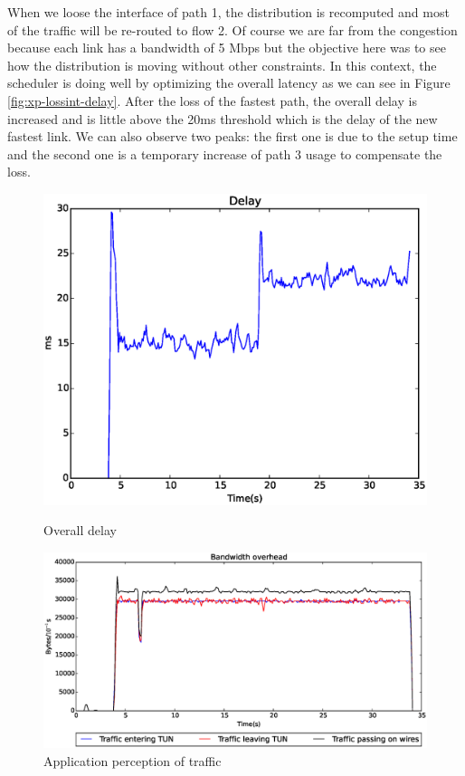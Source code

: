 When we loose the interface of path 1, the distribution is recomputed and most of the traffic will be re-routed to flow 2. Of course we are far from the congestion because each link has a bandwidth of 5 Mbps but the objective here was to see how the distribution is moving without other constraints. In this context, the scheduler is doing well by optimizing the overall latency as we can see in Figure \ref{fig:xp-lossint-delay}. After the loss of the fastest path, the overall delay is increased and is little above the  20ms threshold which is the delay of the new fastest link. We can also observe two peaks: the first one is due to the setup time and the second one is a temporary increase of path 3 usage to compensate the loss.



\begin{figure}[!t]
\centering
\begin{minipage}{0.4\linewidth}
\includegraphics[width=\textwidth]{images/xp/intlost_delay.eps}
\caption{Overall delay}
\label{fig:xp-lossint-delay}
\end{minipage}
\begin{minipage}{0.59\linewidth}
\includegraphics[width=\textwidth]{images/xp/intlost_tun.eps}
\caption{Application perception of traffic}
\label{fig:xp-lossint-tun}
\end{minipage}
\end{figure}

